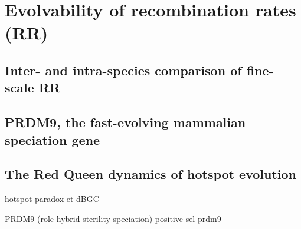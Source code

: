 %
%
%

\section{Evolvability of recombination rates (RR)}
\subsection{Inter- and intra-species comparison of fine-scale RR}
\subsection{PRDM9, the fast-evolving mammalian speciation gene}
\subsection{The Red Queen dynamics of hotspot evolution}
hotspot paradox et dBGC

PRDM9 (role hybrid sterility speciation)
positive sel prdm9









